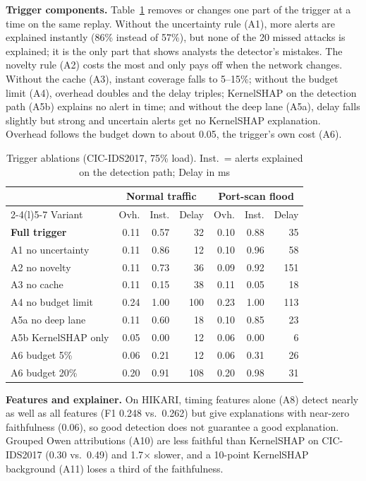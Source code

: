 \documentclass[pdflatex,iicol,sn-mathphys-num]{sn-jnl}
\begin{document}
\textbf{Trigger components.} Table~\ref{tab:abl} removes or changes one part of the trigger at a time on the same replay. Without the uncertainty rule (A1), more alerts are explained instantly (86\% instead of 57\%), but none of the 20 missed attacks is explained; it is the only part that shows analysts the detector's mistakes. The novelty rule (A2) costs the most and only pays off when the network changes. Without the cache (A3), instant coverage falls to 5--15\%; without the budget limit (A4), overhead doubles and the delay triples; KernelSHAP on the detection path (A5b) explains no alert in time; and without the deep lane (A5a), delay falls slightly but strong and uncertain alerts get no KernelSHAP explanation. Overhead follows the budget down to about 0.05, the trigger's own cost (A6).

\begin{table}[!t]
\caption{Trigger ablations (CIC-IDS2017, 75\% load). Inst.\ = alerts explained on the detection path; Delay in ms}\label{tab:abl}
\setlength{\tabcolsep}{1pt}
\begin{tabular*}{\columnwidth}{@{\extracolsep\fill}lrrrrrr@{}}
\toprule
 & \multicolumn{3}{c}{Normal traffic} & \multicolumn{3}{c}{Port-scan flood} \\
\cmidrule(lr){2-4}\cmidrule(l){5-7}
Variant & Ovh. & Inst. & Delay & Ovh. & Inst. & Delay \\
\midrule
\textbf{Full trigger} & 0.11 & 0.57 & 32 & 0.10 & 0.88 & 35 \\
A1 no uncertainty & 0.11 & 0.86 & 12 & 0.10 & 0.96 & 58 \\
A2 no novelty & 0.11 & 0.73 & 36 & 0.09 & 0.92 & 151 \\
A3 no cache & 0.11 & 0.15 & 38 & 0.11 & 0.05 & 18 \\
A4 no budget limit & 0.24 & 1.00 & 100 & 0.23 & 1.00 & 113 \\
A5a no deep lane & 0.11 & 0.60 & 18 & 0.10 & 0.85 & 23 \\
A5b KernelSHAP only & 0.05 & 0.00 & 12 & 0.06 & 0.00 & 6 \\
A6 budget 5\% & 0.06 & 0.21 & 12 & 0.06 & 0.31 & 26 \\
A6 budget 20\% & 0.20 & 0.91 & 108 & 0.20 & 0.98 & 31 \\
\bottomrule
\end{tabular*}
\end{table}

\textbf{Features and explainer.} On HIKARI, timing features alone (A8) detect nearly as well as all features (F1 0.248 vs.\ 0.262) but give explanations with near-zero faithfulness (0.06), so good detection does not guarantee a good explanation. Grouped Owen attributions (A10) are less faithful than KernelSHAP on CIC-IDS2017 (0.30 vs.\ 0.49) and 1.7$\times$ slower, and a 10-point KernelSHAP background (A11) loses a third of the faithfulness.
\end{document}
